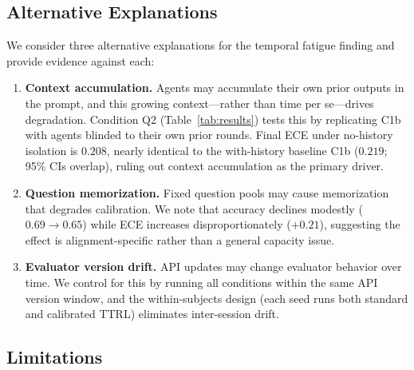 \documentclass[11pt]{article}
\theoremstyle{definition}
\theoremstyle{remark}
\begin{document}
\subsection{Alternative Explanations}

We consider three alternative explanations for the temporal fatigue finding and provide evidence against each:

\begin{enumerate}[leftmargin=*,nosep]
    \item \textbf{Context accumulation.} Agents may accumulate their own prior outputs in the prompt, and this growing context---rather than time per se---drives degradation. Condition Q2 (Table~\ref{tab:results}) tests this by replicating C1b with agents blinded to their own prior rounds. Final ECE under no-history isolation is $0.208$, nearly identical to the with-history baseline C1b ($0.219$; 95\% CIs overlap), ruling out context accumulation as the primary driver.
    \item \textbf{Question memorization.} Fixed question pools may cause memorization that degrades calibration. We note that accuracy declines modestly ($0.69 \to 0.65$) while ECE increases disproportionately ($+0.21$), suggesting the effect is alignment-specific rather than a general capacity issue.
    \item \textbf{Evaluator version drift.} API updates may change evaluator behavior over time. We control for this by running all conditions within the same API version window, and the within-subjects design (each seed runs both standard and calibrated TTRL) eliminates inter-session drift.
\end{enumerate}

\subsection{Limitations}
\end{document}

